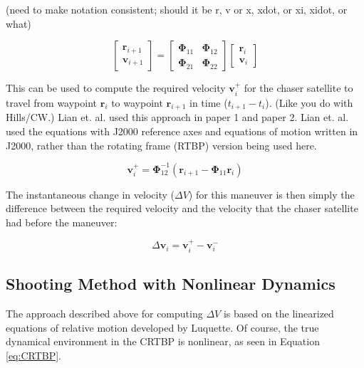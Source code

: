 \documentclass[]{article}
\begin{document}
(need to make notation consistent; should it be r, v or x, xdot, or xi, xidot, or what)

\begin{equation}
\begin{bmatrix}
		\mathbf{r}_{i+1} \\
		\mathbf{v}_{i+1}
		\end{bmatrix}
= 
\begin{bmatrix}
		\boldsymbol{\Phi}_{11} & \boldsymbol{\Phi}_{12} \\
		\boldsymbol{\Phi}_{21} & \boldsymbol{\Phi}_{22}
		\end{bmatrix}
\begin{bmatrix}
		\mathbf{r}_i \\
		\mathbf{v}_i
		\end{bmatrix}
\end{equation}

This can be used to compute the required velocity \(\mathbf{v}_i^+\) for the chaser satellite to travel from waypoint \(\mathbf{r}_i\) to waypoint \(\mathbf{r}_{i+1}\) in time (\(t_{i+1} - t_i\)).  (Like you do with Hills/CW.)  Lian et. al. used this approach in paper 1 and paper 2.  Lian et. al. used the equations with J2000 reference axes and equations of motion written in J2000, rather than the rotating frame (RTBP) version being used here.

\begin{equation} \label{eq:RequiredVelocity}
\mathbf{v}_i^+ = \boldsymbol{\Phi}_{12}^{-1}(\mathbf{r}_{i+1} - \boldsymbol{\Phi}_{11}\mathbf{r}_i)
\end{equation}

The instantaneous change in velocity (\(\Delta V\)) for this maneuver is then simply the difference between the required velocity and the velocity that the chaser satellite had before the maneuver:

\begin{equation} \label{eq:DeltaV}
\Delta \mathbf{v}_i = \mathbf{v}_i^+ - \mathbf{v}_i^-
\end{equation}

\subsection{Shooting Method with Nonlinear Dynamics}

The approach described above for computing \(\Delta V\) is based on the linearized equations of relative motion developed by Luquette.  Of course, the true dynamical environment in the CRTBP is nonlinear, as seen in Equation \ref{eq:CRTBP}.
\end{document}
